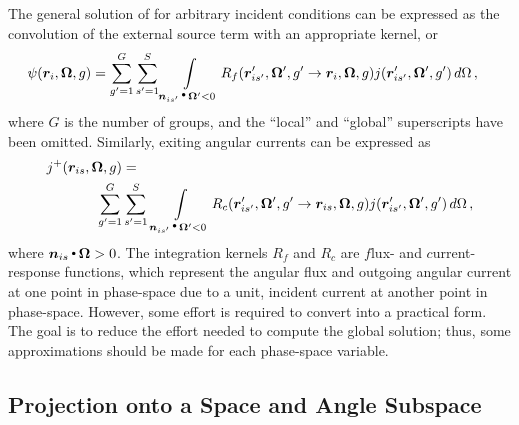 The general solution of  for arbitrary incident conditions 
can be expressed as the convolution of the external source term with an 
appropriate kernel, or
\begin{equation}
    \begin{split}
        \psi(\vec{r}_i, \vec{\Omega},g) =   
        \sum^{G}_{g'=1} &  \sum^{S}_{s'=1}  
        \int\limits_{\vec{n}_{is'} \dotp \vec{\Omega}' < 0} 
        R_{f}(\vec{r}'_{is'},\vec{\Omega}',g' \to 
        \vec{r}_i,\vec{\Omega},g)        
        j (\vec{r}'_{is'},\vec{\Omega}', g') \, d\Omega \, ,             
    \end{split}           
    \label{eq:localflux}
\end{equation}
where $G$ is the number of groups, and the ``local'' and ``global'' superscripts 
have been omitted. Similarly, exiting angular currents can be expressed as 
\begin{equation}
    \begin{split}
        j^+(\vec{r}_{is},\vec{\Omega},g) &= \\
        \sum^{G}_{g'=1} &  \sum^{S}_{s'=1}  \,
        \int\limits_{\vec{n}_{is'} \dotp \vec{\Omega}' < 0} 
        R_{c}(\vec{r}'_{is'},\vec{\Omega}' ,g' \to 
        \vec{r}_{is},\vec{\Omega},g)        
        j (\vec{r}'_{is'},\vec{\Omega}', g') \, d\Omega \, , 
    \end{split}   
    \label{eq:localj}
\end{equation}
where $\bm{n}_{is} \operatorname*{{\scriptscriptstyle \stackrel{\bullet}{{}}}} \bm{\Omega} > 0$. The integration kernels $R_{f}$ 
and 
$R_{c}$ are $f$lux- and $c$urrent-response functions, which represent 
the angular flux and outgoing angular current at one point in phase-space due 
to a unit, incident current at another point in phase-space.  However, some 
effort is required to convert 
 into a practical form.  The goal is 
to 
reduce the effort needed to compute the global solution; thus, some 
approximations should be made for each phase-space variable.

\subsection{Projection onto a Space and Angle Subspace}

